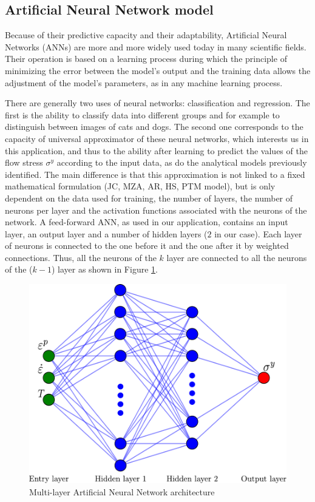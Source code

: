 \documentclass[twoside,english,1p,final,sort&compress]{elsarticle}
\theoremstyle{plain}
\begin{document}
\subsection{Artificial Neural Network model\label{sec:ANNmodel}}
Because of their predictive capacity and their adaptability, Artificial Neural Networks (ANNs) are more and more widely used today in many scientific fields.
Their operation is based on a learning process during which the principle of minimizing the error between the model's output and the training data allows the adjustment of the model's parameters, as in any machine learning process.

There are generally two uses of neural networks: classification and regression.
The first is the ability to classify data into different groups and for example to distinguish between images of cats and dogs.
The second one corresponds to the capacity of universal approximator of these neural networks, which interests us in this application, and thus to the ability after learning to predict the values of the flow stress $\sigma^y$ according to the input data, as do the analytical models previously identified.
The main difference is that this approximation is not linked to a fixed mathematical formulation (JC, MZA, AR, HS, PTM model), but is only dependent on the data used for training, the number of layers, the number of neurons per layer and the activation functions associated with the neurons of the network.
A feed-forward ANN, as used in our application, contains an input layer, an output layer and a number of hidden layers ($2$ in our case).
Each layer of neurons is connected to the one before it and the one after it by weighted connections.
Thus, all the neurons of the $k$ layer are connected to all the neurons of the ($k-1$) layer as shown in Figure \ref{fig:ANN-2HL}.
\begin{figure}[!ht]
\centering
\includegraphics[width=0.7\columnwidth]
{Figures/ANN-scheme-2HL}
\caption{Multi-layer Artificial Neural Network architecture}
\label{fig:ANN-2HL}
\end{figure}
\end{document}
